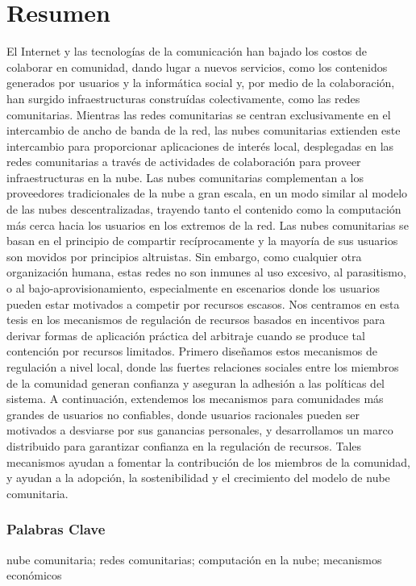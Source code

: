 

\chapter*{Resumen}

El Internet y las tecnologías de la comunicación han bajado los costos de colaborar en comunidad, 
dando lugar a nuevos servicios, como los contenidos generados por usuarios y la informática social y, 
por medio de la colaboración, han surgido infraestructuras construídas colectivamente, como las redes comunitarias. 
Mientras las redes comunitarias se centran exclusivamente en el intercambio de ancho de banda de la red, 
las nubes comunitarias extienden este intercambio para proporcionar aplicaciones de interés local, 
desplegadas en las redes comunitarias a través de actividades de colaboración para proveer infraestructuras en la nube. 
Las nubes comunitarias complementan a los proveedores tradicionales de la nube a gran escala, 
en un modo similar al modelo de las nubes descentralizadas, 
trayendo tanto el contenido como la computación más cerca hacia los usuarios en los extremos de la red. 
Las nubes comunitarias se basan en el principio de compartir recíprocamente y la mayoría de sus usuarios son movidos por principios altruistas. 
Sin embargo, como cualquier otra organización humana, estas redes no son inmunes al uso excesivo, 
al parasitismo, o al bajo-aprovisionamiento, especialmente en escenarios donde los usuarios pueden estar motivados a competir por recursos escasos. 
Nos centramos en esta tesis en los mecanismos de regulación de recursos basados en incentivos
para derivar formas de aplicación práctica del arbitraje cuando se produce tal contención por recursos limitados.
Primero diseñamos estos mecanismos de regulación a nivel local, 
donde las fuertes relaciones sociales entre los miembros de la comunidad generan confianza 
y aseguran la adhesión a las políticas del sistema.
A continuación, extendemos los mecanismos para comunidades más grandes de usuarios no confiables, 
donde usuarios racionales pueden ser motivados a desviarse por sus ganancias personales, 
y desarrollamos un marco distribuido para garantizar confianza en la regulación de recursos. 
Tales mecanismos ayudan a fomentar la contribución de los miembros de la comunidad, 
y ayudan a la adopción, la sostenibilidad y el crecimiento del modelo de nube comunitaria.

\vfill

\subsection*{Palabras Clave} 
		nube comunitaria;
		redes comunitarias;
		computación en la nube;
		mecanismos económicos


